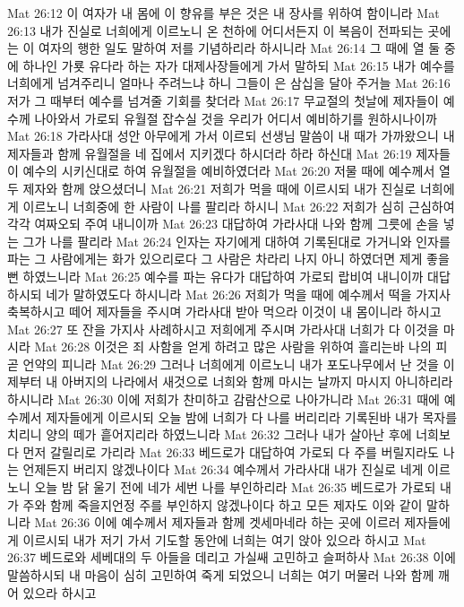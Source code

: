Mat 26:12  이 여자가 내 몸에 이 향유를 부은 것은 내 장사를 위하여 함이니라
Mat 26:13  내가 진실로 너희에게 이르노니 온 천하에 어디서든지 이 복음이 전파되는 곳에는 이 여자의 행한 일도 말하여 저를 기념하리라 하시니라
Mat 26:14  그 때에 열 둘 중에 하나인 가룟 유다라 하는 자가 대제사장들에게 가서 말하되
Mat 26:15  내가 예수를 너희에게 넘겨주리니 얼마나 주려느냐 하니 그들이 은 삼십을 달아 주거늘
Mat 26:16  저가 그 때부터 예수를 넘겨줄 기회를 찾더라
Mat 26:17  무교절의 첫날에 제자들이 예수께 나아와서 가로되 유월절 잡수실 것을 우리가 어디서 예비하기를 원하시나이까
Mat 26:18  가라사대 성안 아무에게 가서 이르되 선생님 말씀이 내 때가 가까왔으니 내 제자들과 함께 유월절을 네 집에서 지키겠다 하시더라 하라 하신대
Mat 26:19  제자들이 예수의 시키신대로 하여 유월절을 예비하였더라
Mat 26:20  저물 때에 예수께서 열 두 제자와 함께 앉으셨더니
Mat 26:21  저희가 먹을 때에 이르시되 내가 진실로 너희에게 이르노니 너희중에 한 사람이 나를 팔리라 하시니
Mat 26:22  저희가 심히 근심하여 각각 여짜오되 주여 내니이까
Mat 26:23  대답하여 가라사대 나와 함께 그릇에 손을 넣는 그가 나를 팔리라
Mat 26:24  인자는 자기에게 대하여 기록된대로 가거니와 인자를 파는 그 사람에게는 화가 있으리로다 그 사람은 차라리 나지 아니 하였더면 제게 좋을뻔 하였느니라
Mat 26:25  예수를 파는 유다가 대답하여 가로되 랍비여 내니이까 대답하시되 네가 말하였도다 하시니라
Mat 26:26  저희가 먹을 때에 예수께서 떡을 가지사 축복하시고 떼어 제자들을 주시며 가라사대 받아 먹으라 이것이 내 몸이니라 하시고
Mat 26:27  또 잔을 가지사 사례하시고 저희에게 주시며 가라사대 너희가 다 이것을 마시라
Mat 26:28  이것은 죄 사함을 얻게 하려고 많은 사람을 위하여 흘리는바 나의 피 곧 언약의 피니라
Mat 26:29  그러나 너희에게 이르노니 내가 포도나무에서 난 것을 이제부터 내 아버지의 나라에서 새것으로 너희와 함께 마시는 날까지 마시지 아니하리라 하시니라
Mat 26:30  이에 저희가 찬미하고 감람산으로 나아가니라
Mat 26:31  때에 예수께서 제자들에게 이르시되 오늘 밤에 너희가 다 나를 버리리라 기록된바 내가 목자를 치리니 양의 떼가 흩어지리라 하였느니라
Mat 26:32  그러나 내가 살아난 후에 너희보다 먼저 갈릴리로 가리라
Mat 26:33  베드로가 대답하여 가로되 다 주를 버릴지라도 나는 언제든지 버리지 않겠나이다
Mat 26:34  예수께서 가라사대 내가 진실로 네게 이르노니 오늘 밤 닭 울기 전에 네가 세번 나를 부인하리라
Mat 26:35  베드로가 가로되 내가 주와 함께 죽을지언정 주를 부인하지 않겠나이다 하고 모든 제자도 이와 같이 말하니라
Mat 26:36  이에 예수께서 제자들과 함께 겟세마네라 하는 곳에 이르러 제자들에게 이르시되 내가 저기 가서 기도할 동안에 너희는 여기 앉아 있으라 하시고
Mat 26:37  베드로와 세베대의 두 아들을 데리고 가실쌔 고민하고 슬퍼하사
Mat 26:38  이에 말씀하시되 내 마음이 심히 고민하여 죽게 되었으니 너희는 여기 머물러 나와 함께 깨어 있으라 하시고
